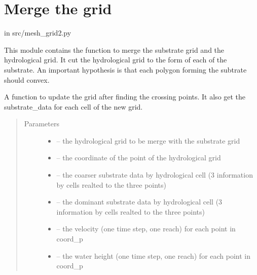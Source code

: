 \documentclass[letterpaper,10pt,english]{sphinxmanual}
\begin{document}
\section{Merge the grid}
\label{\detokenize{index:merge-the-grid}}
in src/mesh\_grid2.py

This module contains the function to merge the substrate grid and the hydrological grid.
It cut the hydrological grid to the form of each of the substrate. An important hypothesis
is that each polygon forming the subtrate should convex.
\label{\detokenize{index:module-src.mesh_grid2}}

\begin{fulllineitems}
\label{\detokenize{index:src.mesh_grid2.create_merge_grid}}
A function to update the grid after finding the crossing points. It also get the substrate\_data for each cell
of the new grid.
\begin{quote}\begin{description}
\item[{Parameters}] \leavevmode\begin{itemize}
\item {} 
 -- the hydrological grid to be merge with the substrate grid

\item {} 
 -- the coordinate of the point of the hydrological grid

\item {} 
 -- the coarser substrate data by hydrological cell (3 information by cells realted to
the three points)

\item {} 
 -- the dominant substrate data by hydrological cell (3 information by cells realted to
the three points)

\item {} 
 -- the velocity (one time step, one reach) for each point in coord\_p

\item {} 
 -- the water height (one time step, one reach) for each point in coord\_p


\end{itemize}
\end{description}
\end{quote}
\end{fulllineitems}
\end{document}
